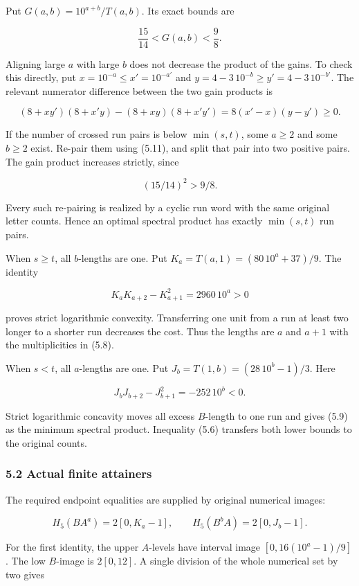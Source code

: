 \documentclass[11pt,a4paper]{article}
\begin{document}
Put \(G(a,b)=10^{a+b}/T(a,b)\). Its exact bounds are

\[
\frac{15}{14}<G(a,b)<\frac98.
\tag{5.10}
\]

Aligning large \(a\) with large \(b\) does not decrease the product of the gains. To check this directly, put \(x=10^{-a}\le x'=10^{-a'}\) and \(y=4-3\,10^{-b}\ge y'=4-3\,10^{-b'}\). The relevant numerator difference between the two gain products is

\[
(8+xy')(8+x'y)-(8+xy)(8+x'y')
=8(x'-x)(y-y')\ge0.
\tag{5.11}
\]

If the number of crossed run pairs is below \(\min(s,t)\), some \(a\ge2\) and some \(b\ge2\) exist. Re-pair them using (5.11), and split that pair into two positive pairs. The gain product increases strictly, since

\[
(15/14)^2>9/8.
\]

Every such re-pairing is realized by a cyclic run word with the same original letter counts. Hence an optimal spectral product has exactly \(\min(s,t)\) run pairs.

When \(s\ge t\), all \(b\)-lengths are one. Put \(K_a=T(a,1)=(80\,10^a+37)/9\). The identity

\[
K_aK_{a+2}-K_{a+1}^2=2960\,10^a>0
\tag{5.12}
\]

proves strict logarithmic convexity. Transferring one unit from a run at least two longer to a shorter run decreases the cost. Thus the lengths are \(a\) and \(a+1\) with the multiplicities in (5.8).

When \(s<t\), all \(a\)-lengths are one. Put \(J_b=T(1,b)=(28\,10^b-1)/3\). Here

\[
J_bJ_{b+2}-J_{b+1}^2=-252\,10^b<0.
\tag{5.13}
\]

Strict logarithmic concavity moves all excess \(B\)-length to one run and gives (5.9) as the minimum spectral product. Inequality (5.6) transfers both lower bounds to the original counts.

\subsubsection{5.2 Actual finite attainers}\label{eporig:actual-finite-attainers}

The required endpoint equalities are supplied by original numerical images:

\[
H_5(BA^a)=2[0,K_a-1],\qquad
H_5(B^bA)=2[0,J_b-1].
\tag{5.14}
\]

For the first identity, the upper \(A\)-levels have interval image \([0,16(10^a-1)/9]\). The low \(B\)-image is \(2[0,12]\). A single division of the whole numerical set by two gives
\end{document}
